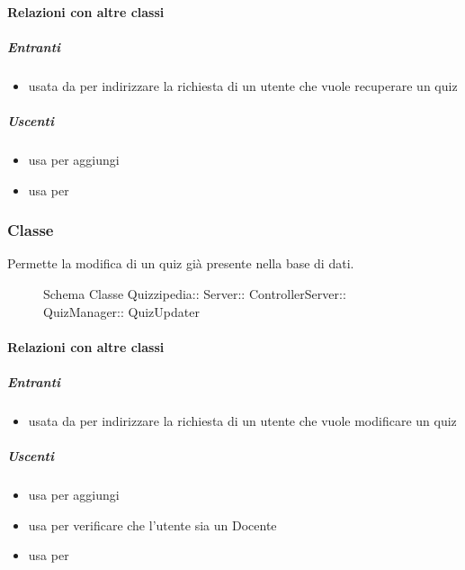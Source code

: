 \paragraph{Relazioni con altre classi}
\subparagraph{Entranti}
\begin{itemize}
\item usata da  per indirizzare la richiesta di un utente che vuole recuperare un quiz
\end{itemize}
\subparagraph{Uscenti}
\begin{itemize}
\item usa  per aggiungi
\item usa  per 
\end{itemize}
\subsubsection{Classe }
Permette la modifica di un quiz già presente nella base di dati.
\begin{figure}[H]
\centering
\noindent{}
\caption[Schema Classe QuizUpdater]{Schema Classe Quizzipedia:: Server:: ControllerServer:: QuizManager:: QuizUpdater}
\end{figure}
\paragraph{Relazioni con altre classi}
\subparagraph{Entranti}
\begin{itemize}
\item usata da  per indirizzare la richiesta di un utente che vuole modificare un quiz
\end{itemize}
\subparagraph{Uscenti}
\begin{itemize}
\item usa  per aggiungi
\item usa  per verificare che l'utente sia un Docente
\item usa  per 
\end{itemize}
